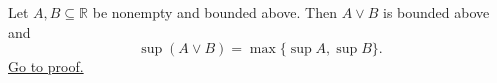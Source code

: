 \begin{theorem}
\label{thm:supremum-pairwise-maximum-set}
Let $A,B\subseteq\mathbb{R}$ be nonempty and bounded above. Then $A\vee B$
is bounded above and
\[
\sup(A\vee B)=\max\{\sup A,\sup B\}.
\]
\hyperref[prf:supremum-pairwise-maximum-set]{Go to proof.}
\end{theorem}